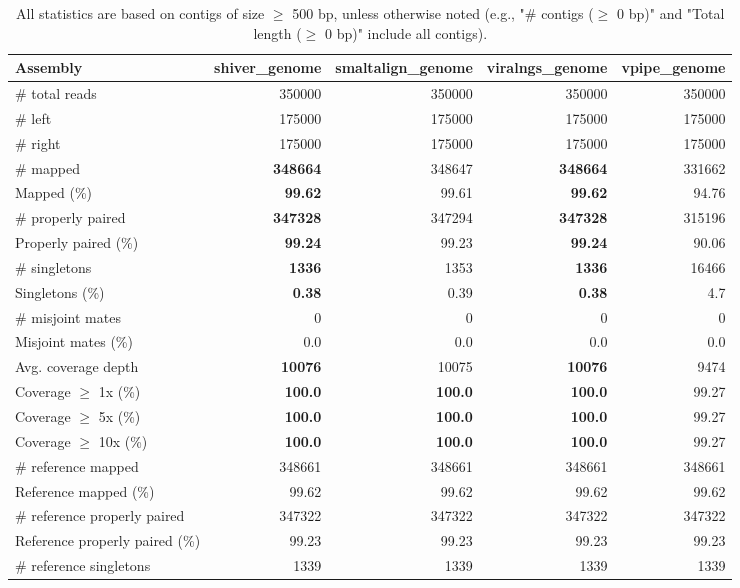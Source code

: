\documentclass[12pt,a4paper]{article}
\begin{document}
\begin{table}[ht]
\begin{center}
\caption{All statistics are based on contigs of size $\geq$ 500 bp, unless otherwise noted (e.g., "\# contigs ($\geq$ 0 bp)" and "Total length ($\geq$ 0 bp)" include all contigs).}
\begin{tabular}{|l*{4}{|r}|}
\hline
Assembly & shiver\_genome & smaltalign\_genome & viralngs\_genome & vpipe\_genome \\ \hline
\# total reads & 350000 & 350000 & 350000 & 350000 \\ \hline
\# left & 175000 & 175000 & 175000 & 175000 \\ \hline
\# right & 175000 & 175000 & 175000 & 175000 \\ \hline
\# mapped & {\bf 348664} & 348647 & {\bf 348664} & 331662 \\ \hline
Mapped (\%) & {\bf 99.62} & 99.61 & {\bf 99.62} & 94.76 \\ \hline
\# properly paired & {\bf 347328} & 347294 & {\bf 347328} & 315196 \\ \hline
Properly paired (\%) & {\bf 99.24} & 99.23 & {\bf 99.24} & 90.06 \\ \hline
\# singletons & {\bf 1336} & 1353 & {\bf 1336} & 16466 \\ \hline
Singletons (\%) & {\bf 0.38} & 0.39 & {\bf 0.38} & 4.7 \\ \hline
\# misjoint mates & 0 & 0 & 0 & 0 \\ \hline
Misjoint mates (\%) & 0.0 & 0.0 & 0.0 & 0.0 \\ \hline
Avg. coverage depth & {\bf 10076} & 10075 & {\bf 10076} & 9474 \\ \hline
Coverage $\geq$ 1x (\%) & {\bf 100.0} & {\bf 100.0} & {\bf 100.0} & 99.27 \\ \hline
Coverage $\geq$ 5x (\%) & {\bf 100.0} & {\bf 100.0} & {\bf 100.0} & 99.27 \\ \hline
Coverage $\geq$ 10x (\%) & {\bf 100.0} & {\bf 100.0} & {\bf 100.0} & 99.27 \\ \hline
\# reference mapped & 348661 & 348661 & 348661 & 348661 \\ \hline
Reference mapped (\%) & 99.62 & 99.62 & 99.62 & 99.62 \\ \hline
\# reference properly paired & 347322 & 347322 & 347322 & 347322 \\ \hline
Reference properly paired (\%) & 99.23 & 99.23 & 99.23 & 99.23 \\ \hline
\# reference singletons & 1339 & 1339 & 1339 & 1339 \\ \hline

\end{tabular}
\end{center}
\end{table}
\end{document}
